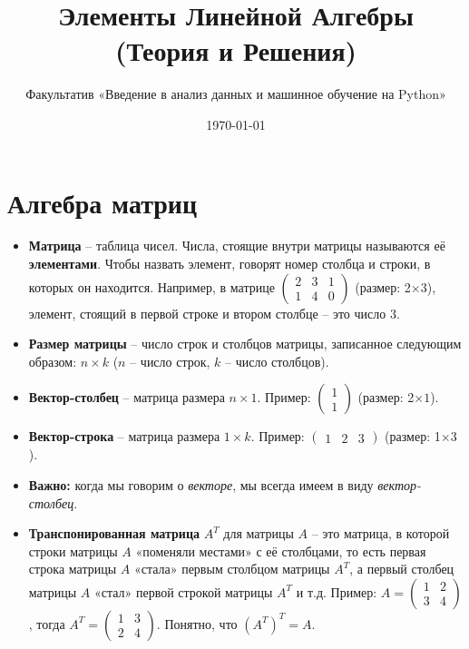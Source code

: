 \documentclass[11pt, a4paper]{extarticle}
\title{Элементы Линейной Алгебры \\ (Теория и Решения)}
\author{Факультатив «Введение в анализ данных и машинное обучение на Python»}
\date{\today}
\begin{document}
	
	\maketitle
	
\section{Алгебра матриц}

\begin{itemize}
	\item \textbf{Матрица} – таблица чисел. Числа, стоящие внутри матрицы называются её \textbf{элементами}. Чтобы назвать элемент, говорят номер столбца и строки, в которых он находится. Например, в матрице $\begin{pmatrix}
	2 & 3 & 1 \\
	1 & 4 & 0
	\end{pmatrix}$ (размер: 2$\times3$), элемент, стоящий в первой строке и втором столбце – это число 3. 
	
	\item \textbf{Размер матрицы} – число строк и столбцов матрицы, записанное следующим образом: $n \times k$ ($n$ – число строк, $k$ – число столбцов).
	
	\item \textbf{Вектор-столбец} – матрица размера $n\times 1$. Пример: $\begin{pmatrix}
	1 \\
	1
	\end{pmatrix}$ (размер: 2$\times1$).
	
	\item \textbf{Вектор-строка} – матрица размера $1\times k$. Пример: $\begin{pmatrix}
	1 & 2 & 3
	\end{pmatrix}$ (размер: 1$\times3$).
	
	\item \textbf{Важно:} когда мы говорим о \textit{векторе}, мы всегда имеем в виду \textit{вектор-столбец}.
	
	\item \textbf{Транспонированная матрица} $A^T$ для матрицы $A$ – это матрица, в которой строки матрицы $A$ «поменяли местами» с её столбцами, то есть первая строка матрицы $A$ «стала» первым столбцом матрицы $A^T$, а первый столбец матрицы $A$ «стал» первой строкой матрицы $A^T$ и т.д. Пример: $A = \begin{pmatrix}
	1 & 2 \\
	3 & 4
	\end{pmatrix}$, тогда $A^T = \begin{pmatrix}
	1 & 3 \\
	2 & 4
	\end{pmatrix}$. Понятно, что $\left(A^T\right)^T = A$.
	

\end{itemize}
\end{document}
